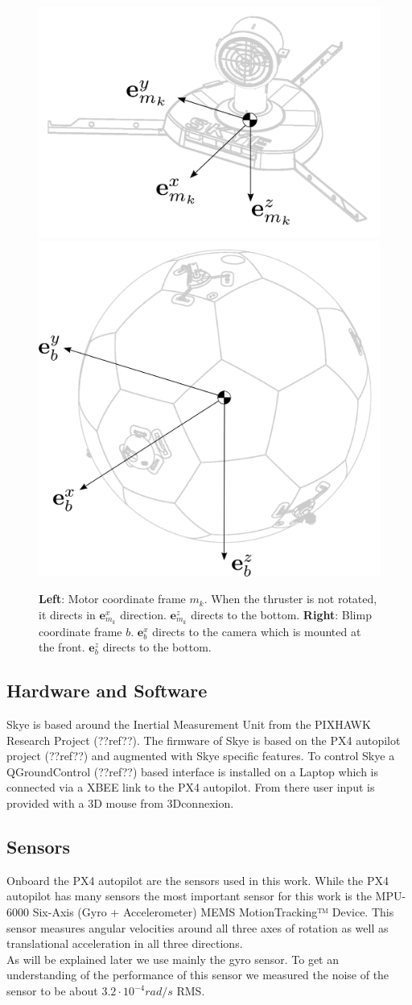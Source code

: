 \begin{figure}[hbtp]
\label{fig:frames}
\centering
\includegraphics[width=.4\linewidth]{images/motor_frame.png}
\includegraphics[width=.4\linewidth]{images/blimp_frame.png}
\caption{\textbf{Left}: Motor coordinate frame $m_k$. When the thruster is not rotated, it directs in $\mathbf{e}^x_{m_k}$ direction. $\mathbf{e}^z_{m_k}$ directs to the bottom. \textbf{Right}: Blimp coordinate frame $b$. $\mathbf{e}^x_{b}$ directs to the camera which is mounted at the front. $\mathbf{e}^z_{b}$ directs to the bottom.}
\end{figure}

\subsection{Hardware and Software}
Skye is based around the Inertial Measurement Unit from the PIXHAWK Research Project (??ref??). 
The firmware of Skye is based on the PX4 autopilot project (??ref??) and augmented with Skye specific features.
To control Skye a QGroundControl (??ref??) based interface is installed on a Laptop which is connected via a XBEE link to the PX4 autopilot.
From there user input is provided with a 3D mouse from 3Dconnexion.

\subsection{Sensors}
Onboard the PX4 autopilot are the sensors used in this work.
While the PX4 autopilot has many sensors the most important sensor for this work is the MPU-6000 Six-Axis (Gyro + Accelerometer) MEMS MotionTracking™ Device.
This sensor measures angular velocities around all three axes of rotation as well as translational acceleration in all three directions. \\
As will be explained later we use mainly the gyro sensor. To get an understanding of the performance of this sensor we measured the noise of the sensor to be about $3.2 \cdot 10^{-4}rad/s$ RMS.

